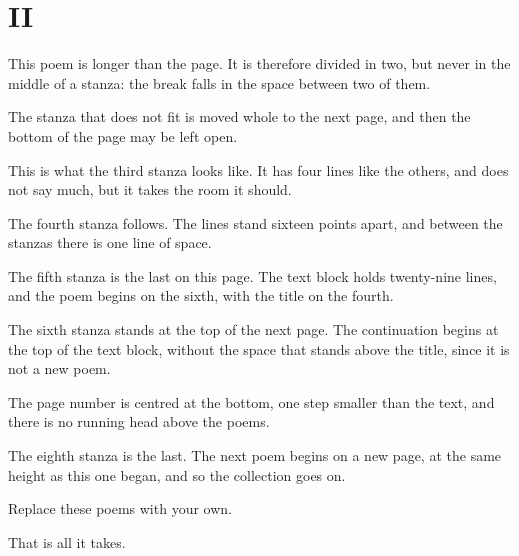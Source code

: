 \documentclass[12pt,twoside]{book}
\begin{document}
\part{II}

\begin{poem}
This poem is longer than the page.
It is therefore divided in two,
but never in the middle of a stanza:
the break falls in the space between two of them.

The stanza that does not fit
is moved whole to the next page,
and then the bottom of the page
may be left open.

This is what the third stanza looks like.
It has four lines like the others,
and does not say much,
but it takes the room it should.

The fourth stanza follows.
The lines stand sixteen points apart,
and between the stanzas
there is one line of space.

The fifth stanza is the last on this page.
The text block holds twenty-nine lines,
and the poem begins on the sixth,
with the title on the fourth.

The sixth stanza stands at the top of the next page.
The continuation begins at the top of the text block,
without the space that stands above the title,
since it is not a new poem.

The page number is centred at the bottom,
one step smaller than the text,
and there is no running head
above the poems.

The eighth stanza is the last.
The next poem begins on a new page,
at the same height as this one began,
and so the collection goes on.
\end{poem}

\begin{poem}
Replace these poems with your own.

That is all it takes.
\end{poem}
\end{document}
